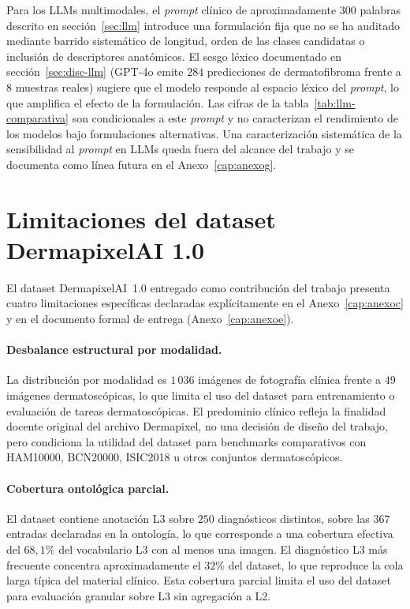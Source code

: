 Para los LLMs multimodales, el \emph{prompt} clínico de
aproximadamente $300$ palabras descrito en sección~\ref{sec:llm}
introduce una formulación fija que no se ha auditado mediante
barrido sistemático de longitud, orden de las clases candidatas o
inclusión de descriptores anatómicos. El sesgo léxico documentado
en sección~\ref{sec:disc-llm} (GPT-4o emite $284$ predicciones de
dermatofibroma frente a $8$ muestras reales) sugiere que el
modelo responde al espacio léxico del \emph{prompt}, lo que
amplifica el efecto de la formulación. Las cifras de la
tabla~\ref{tab:llm-comparativa} son condicionales a este
\emph{prompt} y no caracterizan el rendimiento de los modelos bajo
formulaciones alternativas. Una caracterización sistemática de la
sensibilidad al \emph{prompt} en LLMs queda fuera del alcance del
trabajo y se documenta como línea futura en el
Anexo~\ref{cap:anexog}.

\section{Limitaciones del dataset DermapixelAI 1.0}
\label{sec:lim-dermapixel}

El dataset DermapixelAI~1.0 entregado como contribución del trabajo
presenta cuatro limitaciones específicas declaradas explícitamente
en el Anexo~\ref{cap:anexoc} y en el documento formal de entrega
(Anexo~\ref{cap:anexoe}).

\paragraph{Desbalance estructural por modalidad.}
La distribución por modalidad es $1\,036$ imágenes de fotografía
clínica frente a $49$ imágenes dermatoscópicas, lo que limita
el uso del dataset para entrenamiento o evaluación de tareas
dermatoscópicas. El predominio clínico refleja la finalidad
docente original del archivo Dermapixel, no una decisión de
diseño del trabajo, pero condiciona la utilidad del dataset para
benchmarks comparativos con HAM10000, BCN20000, ISIC2018 u otros
conjuntos dermatoscópicos.

\paragraph{Cobertura ontológica parcial.}
El dataset contiene anotación L3 sobre $250$ diagnósticos
distintos, sobre las $367$ entradas declaradas en la
ontología, lo que corresponde a una cobertura efectiva del
$68{,}1\%$ del vocabulario L3 con al menos una imagen. El
diagnóstico L3 más frecuente concentra aproximadamente el
$32\%$ del dataset, lo que reproduce la cola larga típica del
material clínico. Esta cobertura parcial limita el uso del dataset
para evaluación granular sobre L3 sin agregación a L2.

